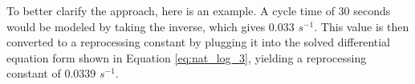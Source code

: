 




To better clarify the approach, here is an example. A cycle time of 30 seconds would be modeled by taking the inverse, which gives 0.033 $s^{-1}$.
This value is then converted to a reprocessing constant by plugging it into the solved differential equation form shown in Equation \eqref{eq:nat_log_3}, yielding a reprocessing constant of 0.0339 $s^{-1}$.





